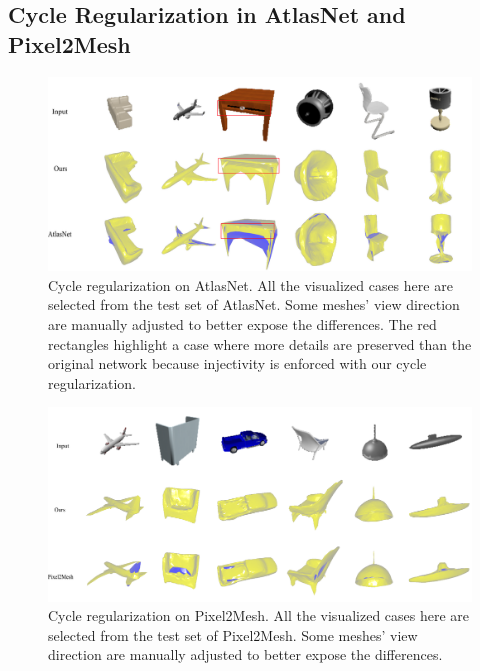\subsection{Cycle Regularization in AtlasNet and Pixel2Mesh}
\begin{figure}
	\centering
	\includegraphics[width=\linewidth]{img/atlas/svr}
	\caption{Cycle regularization on AtlasNet. All the visualized cases here are selected from the test set of AtlasNet. Some meshes' view direction are manually adjusted to better expose the differences. The red rectangles highlight a case where more details are preserved than the original network because injectivity is enforced with our cycle regularization.}
	\label{fig:svr}
\end{figure}
\begin{figure}
	\centering
	\includegraphics[width=\linewidth]{img/p2m/final}
	\caption{Cycle regularization on Pixel2Mesh. All the visualized cases here are selected from the test set of Pixel2Mesh. Some meshes' view direction are manually adjusted to better expose the differences.}
	\label{fig:p2m}
\end{figure}
